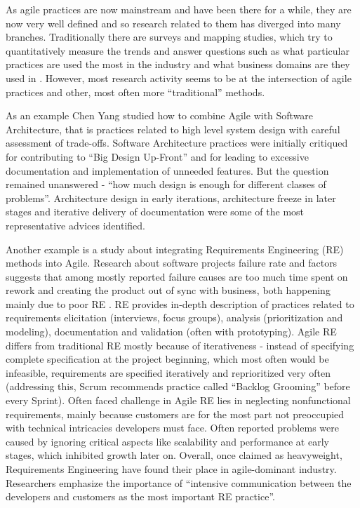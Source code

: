\documentclass{article}
\begin{document}
As agile practices are now mainstream and have been there for a while, they are now very well defined and so research related to them has diverged into many branches. Traditionally there are surveys and mapping studies, which try to quantitatively measure the trends and answer questions such as what particular practices are used the most in the industry and what business domains are they used in \cite{diebold2014agile}. However, most research activity seems to be at the intersection of agile practices and other, most often more ``traditional'' methods.

As an example Chen Yang \cite{yang2016systematic} studied how to combine Agile with Software Architecture, that is practices related to high level system design with careful assessment of trade-offs. Software Architecture practices were initially critiqued for contributing to ``Big Design Up-Front'' and for leading to excessive documentation and implementation of unneeded features. But the question remained unanswered - ``how much design is enough for different classes of problems''. Architecture design in early iterations, architecture freeze in later stages and iterative delivery of documentation were some of the most representative advices identified.

Another example is a study about integrating Requirements Engineering (RE) methods into Agile. Research about software projects failure rate and factors suggests that among mostly reported failure causes are too much time spent on rework and creating the product out of sync with business, both happening mainly due to poor RE \cite{arcidiacono2017comparative}. RE provides in-depth description of practices related to requirements elicitation (interviews, focus groups), analysis (prioritization and modeling), documentation and validation (often with prototyping). Agile RE differs from traditional RE mostly because of iterativeness - instead of specifying complete specification at the project beginning, which most often would be infeasible, requirements are specified iteratively and reprioritized very often (addressing this, Scrum recommends practice called ``Backlog Grooming'' before every Sprint\cite{rubin2012essential}). Often faced challenge in Agile RE lies in neglecting nonfunctional requirements, mainly because customers are for the most part not preoccupied with technical intricacies developers must face. Often reported problems were caused by ignoring critical aspects like scalability and performance at early stages, which inhibited growth later on. Overall, once claimed as heavyweight, Requirements Engineering have found their place in agile-dominant industry. Researchers emphasize the importance of ``intensive communication between the developers and customers as the most important RE practice''. \cite{paetsch2003requirements} \cite{cao2008agile} 
\end{document}
